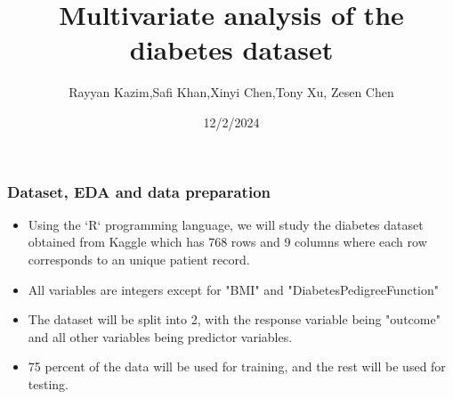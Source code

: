 \documentclass{beamer}
\title{Multivariate analysis of the diabetes dataset}
\author{Rayyan Kazim,Safi Khan,Xinyi Chen,Tony Xu, Zesen Chen}
\institute{McMaster University}
\date{12/2/2024}
\begin{document}
\frame{\titlepage}

\begin{frame}
\frametitle{Dataset, EDA and data preparation}
\begin{itemize}
    \setlength\itemsep{1em}
    \item Using the `R` programming language, we will study the diabetes dataset obtained from Kaggle which has 768 rows and 9 columns where each row corresponds to an unique patient record. 
    \item All variables are integers except for "BMI" and "DiabetesPedigreeFunction"
    \item The dataset will be split into 2, with the response variable being "outcome" and all other variables being predictor variables.
    \item 75 percent of the data will be used for training, and the rest will be used for testing.
\end{itemize}
\end{frame}


\end{document}
